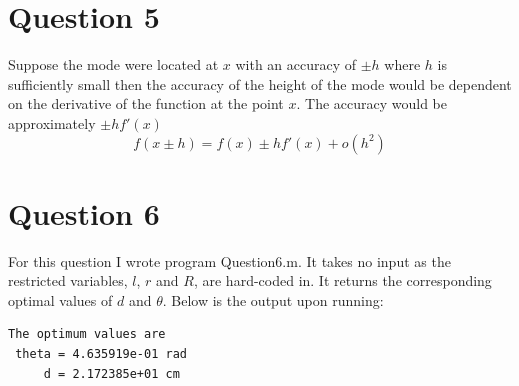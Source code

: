\documentclass[a4paper]{article}
\begin{document}
\pagebreak
\section*{Question 5}
Suppose the mode were located at $x$ with an accuracy of $\pm h$ where $h$ is sufficiently small then the accuracy of the height of the mode would be dependent on the derivative of the function at the point $x$. The accuracy would be approximately $ \pm hf'(x) $
\[ f(x \pm h) = f(x) \pm hf'(x) + o(h^2) \]

\section*{Question 6}
For this question I wrote program Question\textunderscore6.m. It takes no input as the restricted variables, $l$, $r$ and $R$, are hard-coded in. It returns the corresponding optimal values of $d$ and $\theta$. Below is the output upon running:
\begin{verbatim}
The optimum values are 
 theta = 4.635919e-01 rad 
     d = 2.172385e+01 cm 
\end{verbatim}
\end{document}
